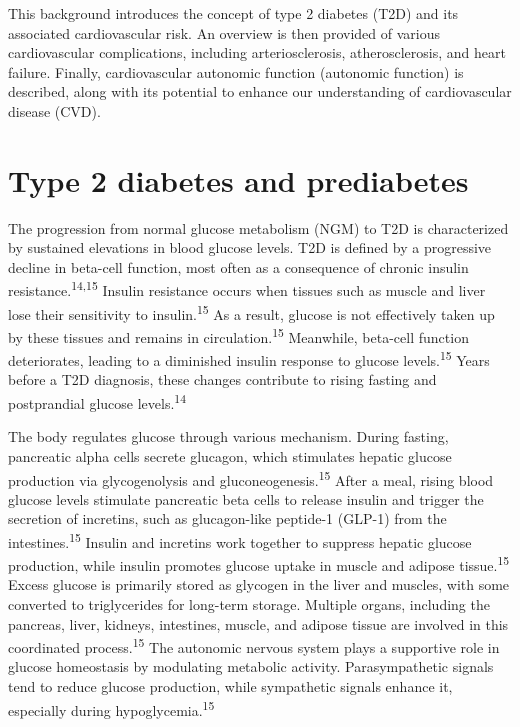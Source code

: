 \documentclass[
  a4paper,
  headsepline=true,
  open=left]{scrbook}
\begin{document}
\clearpage
\null
\thispagestyle{empty}
\clearpage

This background introduces the concept of type 2 diabetes (T2D) and its
associated cardiovascular risk. An overview is then provided of various
cardiovascular complications, including arteriosclerosis,
atherosclerosis, and heart failure. Finally, cardiovascular autonomic
function (autonomic function) is described, along with its potential to
enhance our understanding of cardiovascular disease (CVD).

\hypertarget{type-2-diabetes-and-prediabetes}{%
\section{Type 2 diabetes and
prediabetes}\label{type-2-diabetes-and-prediabetes}}

The progression from normal glucose metabolism (NGM) to T2D is
characterized by sustained elevations in blood glucose levels. T2D is
defined by a progressive decline in beta-cell function, most often as a
consequence of chronic insulin resistance.\textsuperscript{14,15}
Insulin resistance occurs when tissues such as muscle and liver lose
their sensitivity to insulin.\textsuperscript{15} As a result, glucose
is not effectively taken up by these tissues and remains in
circulation.\textsuperscript{15} Meanwhile, beta-cell function
deteriorates, leading to a diminished insulin response to glucose
levels.\textsuperscript{15} Years before a T2D diagnosis, these changes
contribute to rising fasting and postprandial glucose
levels.\textsuperscript{14}

The body regulates glucose through various mechanism. During fasting,
pancreatic alpha cells secrete glucagon, which stimulates hepatic
glucose production via glycogenolysis and
gluconeogenesis.\textsuperscript{15} After a meal, rising blood glucose
levels stimulate pancreatic beta cells to release insulin and trigger
the secretion of incretins, such as glucagon-like peptide-1 (GLP-1) from
the intestines.\textsuperscript{15} Insulin and incretins work together
to suppress hepatic glucose production, while insulin promotes glucose
uptake in muscle and adipose tissue.\textsuperscript{15} Excess glucose
is primarily stored as glycogen in the liver and muscles, with some
converted to triglycerides for long-term storage. Multiple organs,
including the pancreas, liver, kidneys, intestines, muscle, and adipose
tissue are involved in this coordinated process.\textsuperscript{15} The
autonomic nervous system plays a supportive role in glucose homeostasis
by modulating metabolic activity. Parasympathetic signals tend to reduce
glucose production, while sympathetic signals enhance it, especially
during hypoglycemia.\textsuperscript{15}
\end{document}
